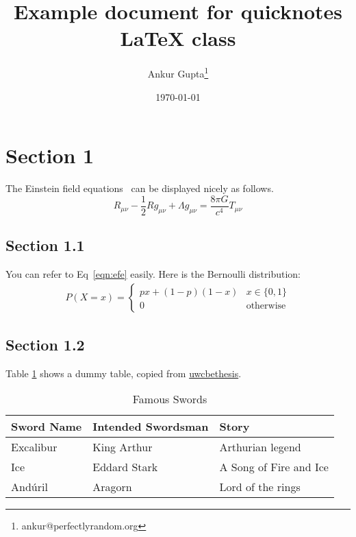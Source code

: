 \documentclass{quicknotes}
\begin{document}
\title{Example document for quicknotes \LaTeX{} class}
\author{Ankur Gupta\thanks{ankur@perfectlyrandom.org}}
\date{\today}
\maketitle
\begin{abstract}
\lipsum[3]
\end{abstract}

\section{Section 1}
The Einstein field equations~\cite{einstein1916foundation} can be displayed nicely as follows.
\begin{equation}
R_{\mu\nu} - \frac{1}{2} R g_{\mu\nu} + \Lambda g_{\mu\nu} = \frac{8 \pi G}{c^4} T_{\mu\nu}
\label{eqn:efe}
\end{equation}

\subsection{Section 1.1}
You can refer to Eq~\ref{eqn:efe} easily. Here is the Bernoulli distribution:
\begin{align}
P(X = x) = \begin{cases}
px + (1-p)(1-x) & x \in \{0, 1\} \\
0 & \text{otherwise}
\end{cases} \label{eqn:bernoulli}
\end{align}

\subsection{Section 1.2}
Table \ref{tab:famousswords} shows a dummy table, copied from
\href{https://github.com/ankur-gupta/uwcbethesis}{uwcbethesis}.

\begin{table}
\caption{Famous Swords}
\label{tab:famousswords}
\centering
\begin{tabular}{lll}
\toprule
Sword Name & Intended Swordsman & Story\\
\midrule
Excalibur & King Arthur & Arthurian legend \\
Ice & Eddard Stark & A Song of Fire and Ice \\
And\'{u}ril & Aragorn & Lord of the rings \\
\bottomrule
\end{tabular}
\end{table}
\end{document}
